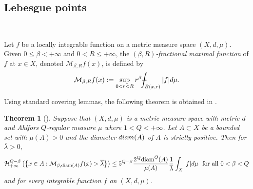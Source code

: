 \documentclass[10pt]{amsart}
\def\Xint#1{\mathchoice
	{\XXint\displaystyle\textstyle{#1}}
	{\XXint\textstyle\scriptstyle{#1}}
	{\XXint\scriptstyle\scriptscriptstyle{#1}}
	{\XXint\scriptscriptstyle\scriptscriptstyle{#1}}
	\!\int}
\def\XXint#1#2#3{{\setbox0=\hbox{$#1{#2#3}{\int}$ }
		\vcenter{\hbox{$#2#3$ }}\kern-.6\wd0}}
\def\dashint{\Xint-}
\newtheorem{theorem}{Theorem}[section]
\numberwithin{equation}{section}
\begin{document}
\subsection{Lebesgue points}\label{lebesgue}\ 

Let $f$ be a locally integrable function on a metric measure space $(X,d,\mu)$. Given $0\leq \beta<{+\infty}$ and $0<R\leq {+\infty}$, the {\it $(\beta,R)$-fractional maximal function} of $f$ at $x\in X$, denoted  $\mathcal M_{\beta,R}f(x)$, is defined by 
\[
\mathcal M_{\beta,R} f(x):=\sup_{0<r<R}r^{\beta} \dashint_{B(x,r)}|f|d\mu.
\]

Using standard covering lemmas, the following theorem is obtained in \cite{HKi98}.
\begin{theorem}[{\cite[Lemma 2.6]{HKi98}}]\label{fractional-maximal-theorem}
Suppose that $(X,d,\mu)$ is a metric measure space with metric $d$ and Ahlfors $Q$-regular measure $\mu$ where $1<Q<+\infty$.
 Let $A\subset X$ be a bounded set with $\mu(A)>0$ and the diameter ${\rm diam}(A)$ of $A$ is strictly positive. Then for $\overline\lambda >0,$
	\[
	\mathcal H^{Q-\beta}_{+\infty}\left(\left\{x\in A:  \mathcal M_{\beta,\text{\rm diam}(A)}f(x)>\overline\lambda \right\}\right)\leq 5^{Q-\beta} \frac{2^Q\text{\rm diam}^Q(A)}{\mu(A)}\frac{1}{\overline\lambda} \int_X|f|d\mu \text{\rm \ \ for all $0<\beta<Q$}
	\] and for every  integrable function $f$ on $(X,d,\mu)$.
\end{theorem}	 

\end{document}
